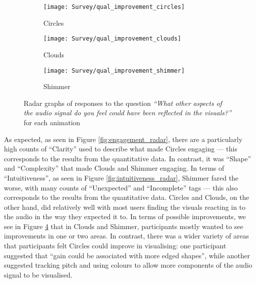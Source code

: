 \documentclass[../initial_thesis.tex]{subfiles}
\begin{document}
\begin{figure}
  \begin{subfigure}{0.5\textwidth}
    \centering
    \texttt{[image: Survey/qual\_improvement\_circles]}
    \caption{Circles}
    \label{fig:improvement_circles}
  \end{subfigure}
  \begin{subfigure}{0.5\textwidth}
    \centering
    \texttt{[image: Survey/qual\_improvement\_clouds]}
    \caption{Clouds}
    \label{fig:improvement_clouds}
  \end{subfigure}
  \begin{subfigure}{0.5\textwidth}
    \centering
    \texttt{[image: Survey/qual\_improvement\_shimmer]}
    \caption{Shimmer}
    \label{fig:improvement_shimmer}
  \end{subfigure}
  \caption{Radar graphs of responses to the question \textit{``What other aspects of the audio signal do you feel could have been reflected in the visuals?''} for each animation}
  \label{fig:improvement_radar}
\end{figure}

As expected, as seen in Figure \ref{fig:engagement_radar}, there are a particularly high counts of ``Clarity'' used to describe what made Circles engaging --- this corresponds to the results from the quantitative data. In contrast, it was ``Shape'' and ``Complexity'' that made Clouds and Shimmer engaging. In terms of ``Intuitiveness'', as seen in Figure \ref{fig:intuitiveness_radar}, Shimmer fared the worse, with many counts of ``Unexpected'' and ``Incomplete'' tags --- this also corresponds to the results from the quantitative data. Circles and Clouds, on the other hand, did relatively well with most users finding the visuals reacting in to the audio in the way they expected it to. In terms of possible improvements, we see in Figure \ref{fig:improvement_radar} that in Clouds and Shimmer, participants mostly wanted to see improvements in one or two areas. In contrast, there was a wider variety of areas that participants felt Circles could improve in visualising: one participant suggested that ``gain could be associated with more edged shapes'', while another suggested tracking pitch and using colours to allow more components of the audio signal to be visualised.
\end{document}
